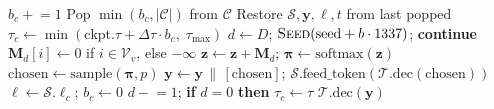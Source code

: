 \documentclass[11pt]{article}
\begin{document}
\begin{algorithm}[H]
\begin{algorithmic}[1]
               $b_c \mathrel{+}= 1$
        \State Pop $\min(b_c, |\mathcal{C}|)$
               from $\mathcal{C}$
        \State Restore $\mathcal{S}, \mathbf{y},
               \ell, t$ from last popped
        \State $\tau_c \gets \min(\text{ckpt}.\tau
               + \Delta\tau \cdot b_c,\;
               \tau_{\max})$
        \State $d \gets D$;\;
               $\textsc{Seed}(\text{seed}
               + b \cdot 1337)$;\;
               \textbf{continue}
    \EndIf
    \State {}
    \State $\mathbf{M}_d[i] \gets 0$ if
           $i \in \mathcal{V}_v$, else $-\infty$
    \State $\mathbf{z} \gets \mathbf{z} + \mathbf{M}_d$;\;
           $\boldsymbol{\pi} \gets
           \text{softmax}(\mathbf{z})$
    \State $\text{chosen} \gets
           \text{sample}(\boldsymbol{\pi}, p)$
    \State {}
    \State $\mathbf{y} \gets \mathbf{y} \,\|\,
           [\text{chosen}]$;\;
           $\mathcal{S}.\text{feed\_token}(
           \mathcal{T}.\text{dec}(\text{chosen}))$
    \State $\ell \gets \mathcal{S}.\ell_c$;\;
           $b_c \gets 0$
    \State {}
        \State $d \mathrel{-}= 1$;\;
               \textbf{if} $d = 0$
               \textbf{then} $\tau_c \gets \tau$
    \EndIf
\EndFor
\State \Return $\mathcal{T}.\text{dec}(\mathbf{y})$
\end{algorithmic}
\end{algorithm}


\end{document}
